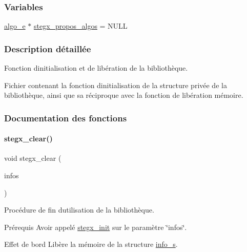 \subsubsection*{Variables}
\begin{DoxyCompactItemize}
\item 
\hyperlink{a00008_adbe3e383e3f1c4239b26ccae2865aa06}{algo\+\_\+e} $\ast$ \hyperlink{a00107_a855163fecb257950934ffba1b73ecae4}{stegx\+\_\+propos\+\_\+algos} = N\+U\+LL
\end{DoxyCompactItemize}


\subsubsection{Description détaillée}
Fonction d\textquotesingle{}initialisation et de libération de la bibliothèque. 

Fichier contenant la fonction d\textquotesingle{}initialisation de la structure privée de la bibliothèque, ainsi que sa réciproque avec la fonction de libération mémoire. 

\subsubsection{Documentation des fonctions}
\mbox{\label{a00107_abe47a9ab49d16f6f0b4812f77e6e44c5}} 
\paragraph{\texorpdfstring{stegx\+\_\+clear()}{stegx\_clear()}}
{\footnotesize\ttfamily void stegx\+\_\+clear (\begin{DoxyParamCaption}\item[{\hyperlink{a00008_aa8ca908d92fb5bdd3c0a9e1f58b2cf03}{info\+\_\+s} $\ast$}]{infos }\end{DoxyParamCaption})}



Procédure de fin d\textquotesingle{}utilisation de la bibliothèque. 

\begin{DoxyParagraph}{Prérequis}
Avoir appelé \hyperlink{a00107_ab6aa5e9de0fc83d5dc066f032c75c51b}{stegx\+\_\+init} sur le paramètre \char`\"{}infos\char`\"{}. 
\end{DoxyParagraph}
\begin{DoxyParagraph}{Effet de bord}
Libère la mémoire de la structure \hyperlink{a00008_aa8ca908d92fb5bdd3c0a9e1f58b2cf03}{info\+\_\+s}. 
\end{DoxyParagraph}

